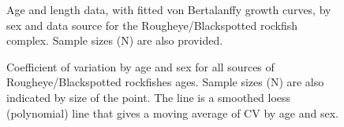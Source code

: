 \documentclass[
]{scrartcl}
\begin{document}
\begin{figure}[H]


\caption{\label{fig-AL_1}Age and length data, with fitted von
Bertalanffy growth curves, by sex and data source for the
Rougheye/Blackspotted rockfish complex. Sample sizes (N) are also
provided.}

\end{figure}%

\begin{figure}[H]


\caption{\label{fig-AL_2}Coefficient of variation by age and sex for all
sources of Rougheye/Blackspotted rockfishes ages. Sample sizes (N) are
also indicated by size of the point. The line is a smoothed loess
(polynomial) line that gives a moving average of CV by age and sex.}

\end{figure}%
\end{document}
